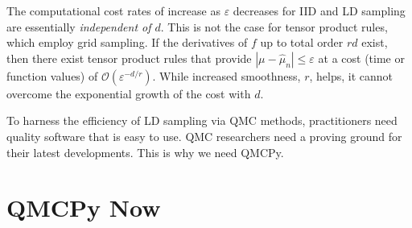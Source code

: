 \documentclass[11pt]{NSFamsart}
\def\abs#1{\ensuremath{\left \lvert #1 \right \rvert}}
\newcommand{\Order}{\mathcal{O}}
\newcommand{\hmu}{\hat{\mu}}
\begin{document}
The computational cost rates of increase as $\varepsilon$ decreases for IID and LD sampling are essentially \emph{independent of $d$}.  This is not the case for tensor product rules, which employ grid sampling.  If the derivatives of $f$ up to total order $rd$ exist, then there exist tensor product rules that provide $\abs{\mu - \hmu_n} \le \varepsilon$  at a cost (time or function values) of $\Order(\varepsilon^{-d/r})$.  While increased smoothness, $r$, helps, it cannot overcome the exponential growth of the cost with $d$.

To harness the efficiency of LD sampling via QMC methods, practitioners need quality software that is easy to use.  QMC researchers need a proving ground for their latest developments.  This is why we need QMCPy.

\section{QMCPy Now}

\end{document}
